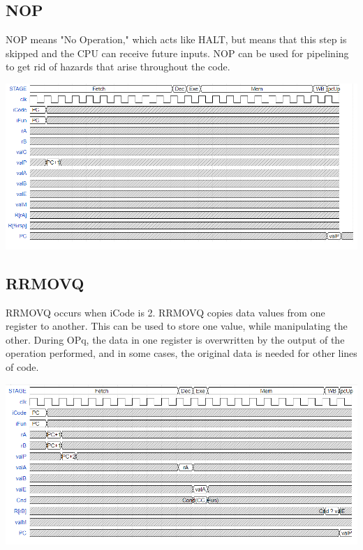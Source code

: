 \documentclass{article}
\begin{document}
\subsection{NOP}
NOP means "No Operation," which acts like HALT, but means that this step is skipped and the CPU can receive future inputs. NOP can be used for pipelining to get rid of hazards that arise throughout the code. 
\begin{center}
    \includegraphics[scale=.6]{NOPpic.png}
\end{center}
\subsection{RRMOVQ}
RRMOVQ occurs when iCode is 2. RRMOVQ copies data values from one register to another. This can be used to store one value, while manipulating the other. During OPq, the data in one register is overwritten by the output of the operation performed, and in some cases, the original data is needed for other lines of code.
\begin{center}
    \includegraphics[scale=.6]{CMOVpic.png}
\end{center}
\end{document}
